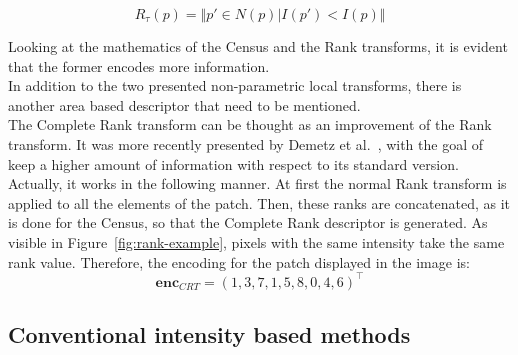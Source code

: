 \begin{equation}
	\label{eqn:rank-transform}
	R_{\tau}(p) = \Vert {p' \in N(p) \vert I(p') < I(p)} \Vert	
\end{equation}

Looking at the mathematics of the Census and the Rank transforms, it is evident that the former encodes more information. \\
In addition to the two presented non-parametric local transforms, there is another area based descriptor that need to be mentioned.\\
The Complete Rank transform can be thought as an improvement of the Rank transform.
It was more recently presented by Demetz et al.~\cite{Demetz2013}, with the goal of keep a higher amount of information with respect to its standard version.
Actually, it works in the following manner.
At first the normal Rank transform is applied to all the elements of the patch. 
Then, these ranks are concatenated, as it is done for the Census, so that the Complete Rank descriptor is generated.  
As visible in Figure~\ref{fig:rank-example}, pixels with the same intensity take the same rank value. 
Therefore, the encoding for the patch displayed in the image is:
\begin{equation}
	\label{eqn:complete-rank-encoding}
	\mathbf{enc}_{CRT} = (1, 3, 7, 1, 5, 8, 0, 4, 6)^\top
\end{equation}

\subsection{Conventional intensity based methods}
\label{subsection:conventional-methods}

